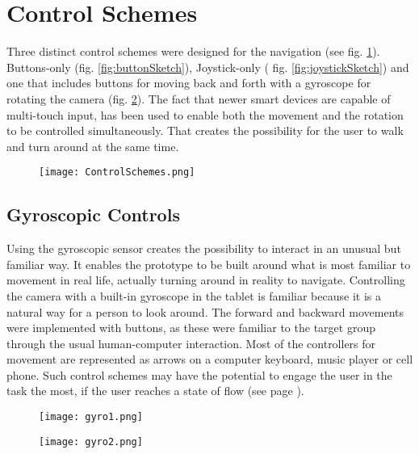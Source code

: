 \section{Control Schemes}
Three distinct control schemes were designed for the navigation (see fig. \ref{fig:ControlSchemes}). Buttons-only (fig. \ref{fig:buttonSketch}), Joystick-only ( fig. \ref{fig:joystickSketch}) and one that includes buttons for moving back and forth with a gyroscope for rotating the camera (fig. \ref{fig:gyroSketch}). The fact that newer smart devices are capable of multi-touch input, has been used to enable both the movement and the rotation to be controlled simultaneously. That creates the possibility for the user to walk and turn around at the same time.

\begin{figure}[H]
\centering
  \texttt{[image: ControlSchemes.png]}
  \label{fig:ControlSchemes}
\end{figure}

\subsection{Gyroscopic Controls}
Using the gyroscopic sensor creates the possibility to interact in an unusual but familiar way. It enables the prototype to be built around what is most familiar to movement in real life,  actually turning around in reality to navigate.
Controlling the camera with a built-in gyroscope in the tablet is familiar because it is a natural way for a person to look around. The forward and backward movements were implemented with  buttons, as these were familiar to the target group through the usual human-computer interaction. Most of the controllers for movement are represented as arrows on a computer keyboard, music player or cell phone.
Such control schemes may have the potential to engage the user in the task the most, if the user reaches a state of flow (see page \pageref{FlowTheory}).

\begin{figure}[H]
\centering
\begin{minipage}{.5\textwidth}
  \centering
  \texttt{[image: gyro1.png]}
\end{minipage}%
\begin{minipage}{.5\textwidth}
  \centering
  \texttt{[image: gyro2.png]}
\end{minipage}
  \label{fig:gyroSketch}

\end{figure}


